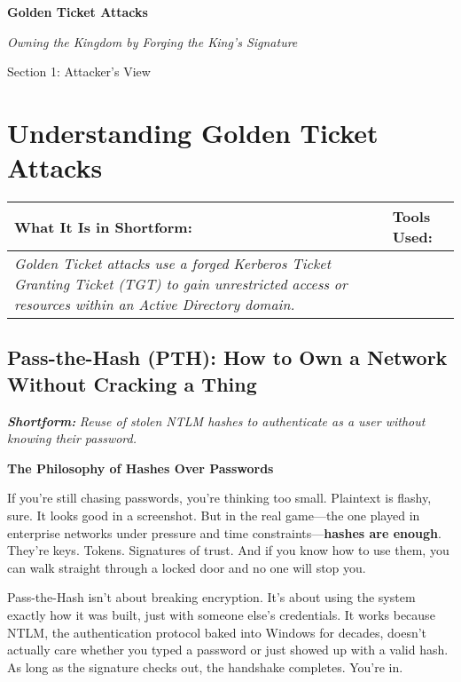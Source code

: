 
\textbf{Golden Ticket Attacks}

\textit{Owning the Kingdom by Forging the King’s Signature}

Section 1: Attacker’s View

\section{\textbf{Understanding Golden Ticket Attacks}}

\begin{table}
\justifying

\begin{tabular}{| l | l |}
\hline
\textbf{What It Is in Shortform:} & \textbf{Tools Used:} \\
\hline
\textit{Golden Ticket attacks use a forged Kerberos Ticket Granting Ticket (TGT) to gain unrestricted access or resources within an Active Directory domain.} &  \\
\hline

\end{tabular}

\end{table}

\subsection{\textbf{Pass-the-Hash (PTH): How to Own a Network Without Cracking a Thing}}

\textit{\textbf{Shortform: }}\textit{Reuse of stolen NTLM hashes to authenticate as a user without knowing their password.}

\textbf{The Philosophy of Hashes Over Passwords}

If you’re still chasing passwords, you’re thinking too small. Plaintext is flashy, sure. It looks good in a screenshot. But in the real game—the one played in enterprise networks under pressure and time constraints—\textbf{hashes are enough}. They’re keys. Tokens. Signatures of trust. And if you know how to use them, you can walk straight through a locked door and no one will stop you.

Pass-the-Hash isn’t about breaking encryption. It’s about using the system exactly how it was built, just with someone else’s credentials. It works because NTLM, the authentication protocol baked into Windows for decades, doesn’t actually care whether you typed a password or just showed up with a valid hash. As long as the signature checks out, the handshake completes. You're in.

